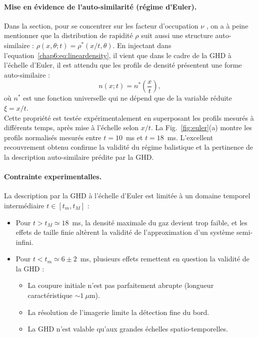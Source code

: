 \paragraph{Mise en évidence de l’auto-similarité (régime d’Euler).}
Dans la section, pour se concentrer sur les facteur d'occupation $\nu$ , on a à peine mentionner que la distribution de rapidité $\rho$ suit aussi une structure auto-similaire : $\rho(x , \theta ;t) = \rho^\ast(x/t , \theta)$. 
En injectant dans l'equation~\eqref{chap6:eq:lineardensity}, il vient que dans le cadre de la GHD à l’échelle d’Euler, il est attendu que les profils de densité présentent une forme auto-similaire :
\begin{equation}
	n(x;t) = n^\ast\left( \frac{x}{t} \right),
\end{equation}
où $n^\ast$ est une fonction universelle qui ne dépend que de la variable réduite $\xi = x/t$.\\

Cette propriété est testée expérimentalement en superposant les profils mesurés à différents temps, après mise à l’échelle selon $x/t$. La Fig.~\ref{fig:euler}(a) montre les profils normalisés mesurés entre $t = 10$~ms et $t = 18$~ms. L’excellent recouvrement obtenu confirme la validité du régime balistique et la pertinence de la description auto-similaire prédite par la GHD.

\paragraph{Contrainte experimentalles.}

La description par la GHD à l’échelle d’Euler est limitée à un domaine temporel intermédiaire $t \in [t_m, t_M]$ :

\begin{itemize}
  \item Pour $t > t_M \simeq 18$~ms, la densité maximale du gaz devient trop faible, et les effets de taille finie altèrent la validité de l’approximation d’un système semi-infini.
  \item Pour $t < t_m \simeq 6 \pm 2$~ms, plusieurs effets remettent en question la validité de la GHD :
  \begin{itemize}
    \item La coupure initiale n’est pas parfaitement abrupte (longueur caractéristique $\sim 1~\mu$m).
    \item La résolution de l’imagerie limite la détection fine du bord.
    \item La GHD n’est valable qu’aux grandes échelles spatio-temporelles.
  \end{itemize}
\end{itemize}

